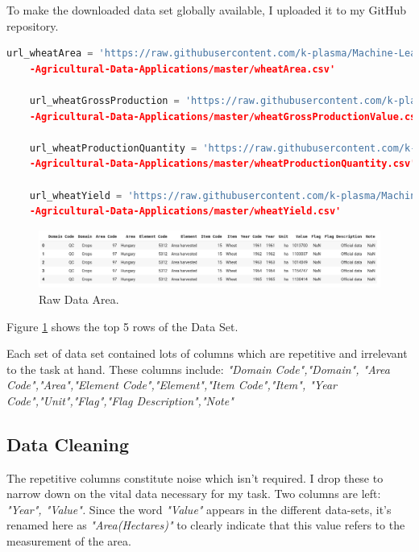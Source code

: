 \documentclass[
]{thesis-ekf}
\begin{document}
To make the downloaded data set globally available, I uploaded it to my GitHub repository.\cite{adeyemo_2020}

\begin{lstlisting}[language=Python]
	url_wheatArea = 'https://raw.githubusercontent.com/k-plasma/Machine-Learning-Models-for
	-Agricultural-Data-Applications/master/wheatArea.csv'	
	
	url_wheatGrossProduction = 'https://raw.githubusercontent.com/k-plasma/Machine-Learning-Models-for
	-Agricultural-Data-Applications/master/wheatGrossProductionValue.csv'	
	
	url_wheatProductionQuantity = 'https://raw.githubusercontent.com/k-plasma/Machine-Learning-Models-for
	-Agricultural-Data-Applications/master/wheatProductionQuantity.csv'	
	
	url_wheatYield = 'https://raw.githubusercontent.com/k-plasma/Machine-Learning-Models-for
	-Agricultural-Data-Applications/master/wheatYield.csv'
\end{lstlisting}

\begin{figure}[h!]
	\includegraphics[width=\textwidth,height=\textheight,keepaspectratio]{fig/Area_Head.png}
	\caption{Raw Data Area.}
	\label{fig:Areaa_Head1}
\end{figure}

Figure \ref{fig:Areaa_Head1} shows the top 5 rows of the Data Set.


Each set of data set contained lots of columns which are repetitive and irrelevant to the task at hand. These columns include: \textit{"Domain Code","Domain",
	"Area Code","Area","Element Code","Element","Item Code","Item",
	"Year Code","Unit","Flag","Flag Description","Note"}

\subsection{Data Cleaning} 
The repetitive columns constitute noise which isn't required. I drop these to narrow down on the vital data necessary for my task. Two columns are left: \textit{"Year", "Value".} Since the word \textit{"Value"} appears in the different data-sets, it's renamed here as \textit{"Area(Hectares)"} to clearly indicate that this value refers to the measurement of the area.
\end{document}
